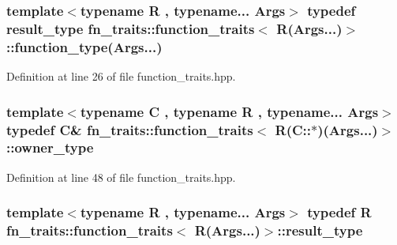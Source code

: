 \subsubsection[{\texorpdfstring{function\+\_\+type}{function_type}}]{\setlength{\rightskip}{0pt plus 5cm}template$<$typename R , typename... Args$>$ typedef {\bf result\+\_\+type} {\bf fn\+\_\+traits\+::function\+\_\+traits}$<$ R(Args...)$>$\+::function\+\_\+type(Args...)\hspace{0.3cm}{\ttfamily [inherited]}}\hypertarget{structfn__traits_1_1function__traits_3_01_r_07_args_8_8_8_08_4_a85e5883a1c8050fe442c1072386b2d11}{}\label{structfn__traits_1_1function__traits_3_01_r_07_args_8_8_8_08_4_a85e5883a1c8050fe442c1072386b2d11}


Definition at line 26 of file function\+\_\+traits.\+hpp.

\subsubsection[{\texorpdfstring{owner\+\_\+type}{owner_type}}]{\setlength{\rightskip}{0pt plus 5cm}template$<$typename C , typename R , typename... Args$>$ typedef C\& {\bf fn\+\_\+traits\+::function\+\_\+traits}$<$ R(C\+::$\ast$)(Args...)$>$\+::{\bf owner\+\_\+type}}\hypertarget{structfn__traits_1_1function__traits_3_01_r_07_c_1_1_5_08_07_args_8_8_8_08_4_aa6e7fe5af891f86ccb332181422c219d}{}\label{structfn__traits_1_1function__traits_3_01_r_07_c_1_1_5_08_07_args_8_8_8_08_4_aa6e7fe5af891f86ccb332181422c219d}


Definition at line 48 of file function\+\_\+traits.\+hpp.

\subsubsection[{\texorpdfstring{result\+\_\+type}{result_type}}]{\setlength{\rightskip}{0pt plus 5cm}template$<$typename R , typename... Args$>$ typedef R {\bf fn\+\_\+traits\+::function\+\_\+traits}$<$ R(Args...)$>$\+::{\bf result\+\_\+type}\hspace{0.3cm}{\ttfamily [inherited]}}\hypertarget{structfn__traits_1_1function__traits_3_01_r_07_args_8_8_8_08_4_a1b509243ed1b4707465625de10e6c6bb}{}\label{structfn__traits_1_1function__traits_3_01_r_07_args_8_8_8_08_4_a1b509243ed1b4707465625de10e6c6bb}


